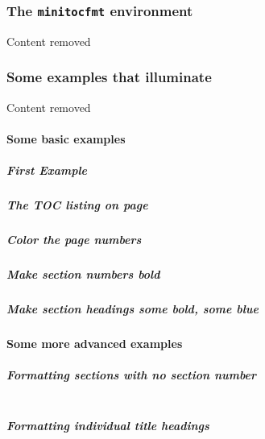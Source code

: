 \documentclass{article}
\newcommand{\insMinitoc}[2][]{%
  \begin{center}#2
  \begin{minipage}[c]{0.8\linewidth}
  \insertminitoc[#1]
  \end{minipage}
  \end{center}
}
\newcommand{\insMinitoctab}[2][]{%
  \begin{center}#2
  \begin{tabular}{c}\toprule
  \begin{minipage}[c]{0.8\linewidth}
  \insertminitoc[#1]
  \end{minipage}\\ \bottomrule
  \end{tabular}
  \end{center}
}
\begin{document}
\subsubsection{The \texttt{minitocfmt} environment}

Content removed

\subsubsection{Some examples that illuminate}

Content removed

\goodbreak

\paragraph{Some basic examples} \leavevmode

\subparagraph{First Example}  \leavevmode

\insMinitoc[CandM]\minitocFmt

\subparagraph{The TOC listing on page~\pageref*{SExmpls}} \leavevmode

\insMinitoc[SExmpls]{\minitocFmtv}

\subparagraph{Color the page numbers} \leavevmode

\insMinitoc[CandM]\minitocFmti

\subparagraph{Make section numbers bold} \leavevmode

\insMinitoc[CandM]\minitocFmtii

\subparagraph{Make section headings some bold, some blue} \leavevmode

\insMinitoc[CandM]\minitocFmtvii

\paragraph{Some more advanced examples} \leavevmode

\subparagraph{Formatting sections with no section number} \leavevmode

\begin{minitocfmt}{\minitocFmtstar}
\end{minitocfmt}
\insMinitoctab[myRetirement]{\minitocFmtstar}

\subparagraph{Formatting individual title headings} \leavevmode

\insMinitoc[CandM]\minitocFmtiv
\end{document}
